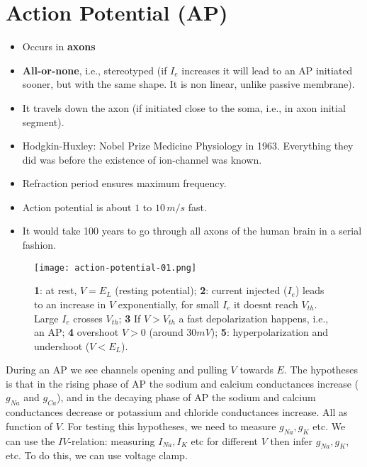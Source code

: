 \documentclass[main]{subfiles}
\begin{document}

\section{Action Potential (AP)}
\begin{itemize}[noitemsep,nolistsep]
	\item Occurs in \textbf{axons}
	\item \textbf{All-or-none}, i.e., stereotyped (if $I_e$ increases it will lead to an AP initiated sooner, but with the same shape. It is non linear, unlike passive membrane).
	\item It travels down the axon (if initiated close to the soma, i.e., in axon initial segment).
	\item Hodgkin-Huxley: Nobel Prize Medicine Physiology in 1963. Everything they did was before the existence of ion-channel was known.
	\item Refraction period ensures maximum frequency.
	\item Action potential is about $1$ to $10\,m/s$ fast.
	\item It would take 100 years to go through all axons of the human brain in a serial fashion.
\end{itemize}

\begin{figure}[H]
	\centering
	\texttt{[image: action-potential-01.png]}
	\caption{\textbf{1}: at rest, $V=E_L$ (resting potential); \textbf{2}: current injected ($I_e$) leads to an increase in $V$ exponentially, for small $I_e$ it doesnt reach $V_{th}$. Large $I_e$ crosses $V_{th}$; \textbf{3} If $V > V_{th}$ a fast depolarization happens, i.e., an AP; \textbf{4} overshoot $V > 0$ (around $30mV$); \textbf{5}: hyperpolarization and undershoot ($V < E_L$).}
\end{figure}

During an AP we see channels opening and pulling $V$ towards $E$. 
The hypotheses is that in the rising phase of AP the sodium and calcium conductances increase ($g_{Na}$ and $g_{Ca}$), and in the decaying phase of AP the sodium and calcium conductances decrease or potassium and chloride conductances increase. All as function of $V$.
For testing this hypotheses, we need to measure $g_{Na}, g_K$ etc. We can use the $IV$-relation: measuring $I_{Na}, I_K$ etc for different $V$ then infer $g_{Na}, g_K$, etc. To do this, we can use voltage clamp.
\end{document}
